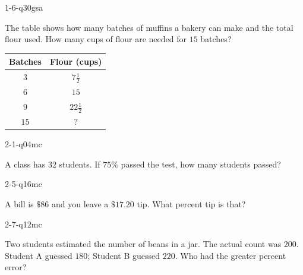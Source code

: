 \begin{practiceQuestion}{1-6-q30}{gsa}
\begin{questionText}
The table shows how many batches of muffins a bakery can make and the total flour used. How many cups of flour are needed for $15$ batches?

\begin{center}
\begin{tabular}{|c|c|}
\hline
\textbf{Batches} & \textbf{Flour (cups)} \\ \hline
$3$ & $7\frac{1}{2}$ \\ \hline
$6$ & $15$ \\ \hline
$9$ & $22\frac{1}{2}$ \\ \hline
$15$ & $?$ \\ \hline
\end{tabular}
\end{center}
\end{questionText}
\end{practiceQuestion}

\begin{practiceQuestion}{2-1-q04}{mc}
\begin{questionText}
A class has $32$ students. If $75\%$ passed the test, how many students passed?
\end{questionText}
\end{practiceQuestion}

\begin{practiceQuestion}{2-5-q16}{mc}
\begin{questionText}
A bill is $\$86$ and you leave a $\$17.20$ tip. What percent tip is that?
\end{questionText}
\end{practiceQuestion}

\begin{practiceQuestion}{2-7-q12}{mc}
\begin{questionText}
Two students estimated the number of beans in a jar. The actual count was $200$. Student A guessed $180$; Student B guessed $220$. Who had the greater percent error?
\end{questionText}
\end{practiceQuestion}


